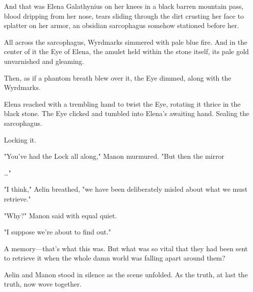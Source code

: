 And that was Elena Galathynius on her knees in a black barren mountain pass, blood dripping from her nose, tears sliding through the dirt crusting her face to splatter on her armor, an obsidian sarcophagus somehow stationed before her.

All across the sarcophagus, Wyrdmarks simmered with pale blue fire. And in the center of it  the Eye of Elena, the amulet held within the stone itself, its pale gold unvarnished and gleaming.

Then, as if a phantom breath blew over it, the Eye dimmed, along with the Wyrdmarks.

Elena reached with a trembling hand to twist the Eye, rotating it thrice in the black stone. The Eye clicked and tumbled into Elena's awaiting hand. Sealing the sarcophagus.

Locking it.

"You've had the Lock all along," Manon murmured. "But then the mirror

\ldots"

"I think," Aelin breathed, "we have been deliberately misled about what we must retrieve."

"Why?" Manon said with equal quiet.

"I suppose we're about to find out."

A memory---that's what this was. But what was so vital that they had been sent to retrieve it when the whole damn world was falling apart around them?

Aelin and Manon stood in silence as the scene unfolded. As the truth, at last the truth, now wove together.
